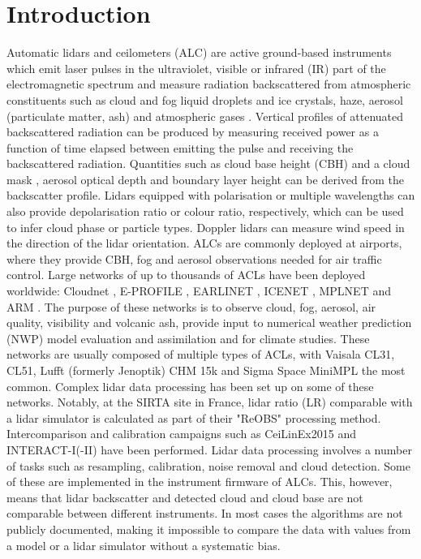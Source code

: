 \section{Introduction}

Automatic lidars and ceilometers (ALC) are active ground-based instruments
which emit laser pulses in the ultraviolet, visible or infrared (IR) part of the
electromagnetic spectrum and measure radiation backscattered from atmospheric
constituents such as cloud and fog liquid droplets and ice crystals, haze,
aerosol (particulate matter, ash) and atmospheric gases \citep{emeis2010}.
Vertical profiles of attenuated backscattered radiation can be produced
by measuring received power as a function of time elapsed between emitting the
pulse and receiving the backscattered radiation. Quantities such as
cloud base height (CBH) and a cloud mask
\citep{pal1992,wang2001,martucci2010,costa-suros2013,tricht2014,liu2015b,liu2015a,lewis2016,cromwell2018,silber2018}, aerosol optical depth
\citep{marenco1997,welton2000,welton2002,wiegner2012,wiegner2014,jin2015,dionisi2018} and boundary layer height
\citep{eresmaa2006,munkel2007,emeis2009,tsaknakis2011,milroy2012,knepp2017}
can be derived from the
backscatter profile. Lidars equipped with polarisation or multiple wavelengths
can also provide depolarisation ratio or colour ratio, respectively, which can be used
to infer cloud phase or particle types. Doppler lidars can measure wind
speed in the direction of the lidar orientation. ALCs are commonly deployed
at airports, where they provide CBH, fog and aerosol observations
needed for air traffic control. Large networks of up to
thousands of ACLs have been deployed worldwide: Cloudnet \citep{illingworth2007},
E-PROFILE \citep{illingworth2018}, EARLINET \citep{pappalardo2014},
ICENET \citep{cazorla2017}, MPLNET \citep{welton2006} and ARM \citep{stokes1994,campbell2002}.
The purpose of these networks is to observe cloud, fog, aerosol, air quality,
visibility and volcanic ash, provide input to numerical weather prediction (NWP)
model evaluation and
assimilation \citep{illingworth2015a,illingworth2018} and for climate studies.
These networks are usually composed of multiple types of ACLs, with Vaisala CL31,
CL51, Lufft (formerly Jenoptik) CHM 15k and Sigma Space MiniMPL
the most common.
Complex lidar data processing has been set up on some of these networks. Notably,
at the SIRTA site in France, lidar ratio (LR)
comparable with a lidar simulator \citep{chiriaco2018} is calculated 
as part of their "ReOBS" processing method. Intercomparison and calibration campaigns such as
CeiLinEx2015 \citep{mattis2016} and INTERACT-I(-II)
\citep{rosoldi2018,madonna2018} have been performed.
Lidar data processing involves a number of tasks such as resampling,
calibration, noise removal and cloud detection. Some of these are implemented
in the instrument firmware of ALCs. This, however, means that
lidar backscatter and detected cloud and cloud base are not comparable
between different instruments. In most cases the algorithms are not publicly
documented, making it impossible to compare the data with values from a model or a lidar simulator
without a systematic bias.


